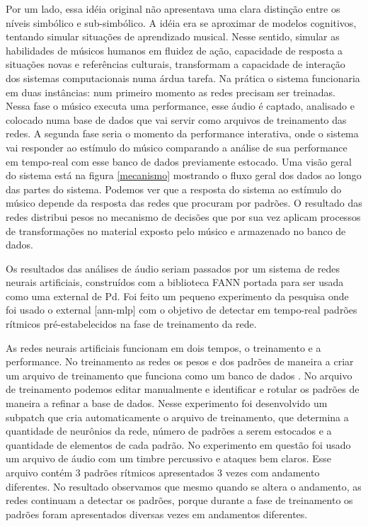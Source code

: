 \documentclass{ppgmus}
\begin{document}
Por um lado, essa idéia original não apresentava uma clara distinção entre os níveis simbólico e sub-simbólico.
A idéia era se aproximar de modelos cognitivos, tentando simular situações de aprendizado musical.
Nesse sentido, simular as habilidades de músicos humanos em fluidez de ação, capacidade de 
resposta a situações novas e referências culturais, transformam a capacidade de interação dos sistemas computacionais 
numa árdua tarefa. Na prática o sistema funcionaria em duas instâncias: num primeiro momento as redes precisam ser 
treinadas. Nessa fase o músico executa uma performance, esse áudio é captado, analisado e colocado numa base de dados 
que vai servir como arquivos de treinamento das redes. A segunda fase seria o momento da performance interativa, 
onde o sistema vai responder ao estímulo do músico comparando a análise de sua performance em tempo-real com esse 
banco de dados previamente estocado. Uma visão geral do sistema está na figura \ref{mecanismo} mostrando o fluxo 
geral dos dados ao longo das partes do sistema. Podemos ver que a resposta do sistema ao estímulo do músico depende 
da resposta das redes que procuram por padrões. O resultado das redes distribui pesos no mecanismo de decisões que por 
sua vez aplicam processos de transformações no material exposto pelo músico e armazenado no banco de dados.
   

Os resultados das análises de áudio seriam passados por um sistema de redes neurais artificiais, 
construídos com a biblioteca FANN \cite{fann}  portada para ser usada como uma external de Pd.  
Foi feito um pequeno experimento da pesquisa onde foi usado o external [ann-mlp] com o objetivo de detectar  em tempo-real padrões 
rítmicos pré-estabelecidos na fase de treinamento da rede.
    
As redes neurais artificiais funcionam em dois tempos, o treinamento e a performance. No treinamento as redes os pesos e 
dos padrões de maneira a criar um arquivo de treinamento que funciona como um banco de dados . No arquivo de treinamento 
podemos editar manualmente e identificar e rotular os padrões de maneira a refinar a base de dados. Nesse experimento foi 
desenvolvido um subpatch que cria automaticamente o arquivo de treinamento, que determina a quantidade de neurônios da 
rede, número de padrões a serem estocados e a quantidade de elementos de cada padrão.
   No experimento em questão foi usado um arquivo de áudio com um timbre percussivo e ataques bem claros. Esse arquivo 
contém 3 padrões rítmicos apresentados 3 vezes com  andamento diferentes. No resultado observamos que mesmo quando se 
altera o andamento, as redes continuam a detectar os padrões, porque durante a fase de treinamento os padrões foram 
apresentados diversas vezes em andamentos diferentes.
\end{document}
